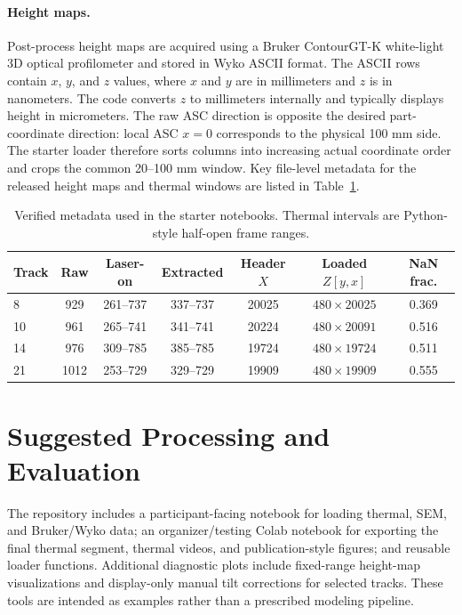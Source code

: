 \documentclass[10pt]{article}
\begin{document}
\paragraph{Height maps.}
Post-process height maps are acquired using a Bruker ContourGT-K white-light 3D optical profilometer and stored in Wyko ASCII format. The ASCII rows contain $x$, $y$, and $z$ values, where $x$ and $y$ are in millimeters and $z$ is in nanometers. The code converts $z$ to millimeters internally and typically displays height in micrometers. The raw ASC direction is opposite the desired part-coordinate direction: local ASC $x=0$ corresponds to the physical 100 mm side. The starter loader therefore sorts columns into increasing actual coordinate order and crops the common 20--100 mm window. Key file-level metadata for the released height maps and thermal windows are listed in Table~\ref{tab:data}.

\begin{table}[t]
\centering
\caption{Verified metadata used in the starter notebooks. Thermal intervals are Python-style half-open frame ranges.}
\small
\begin{tabular}{lcccccc}
\toprule
Track & Raw & Laser-on & Extracted & Header $X$ & Loaded $Z[y,x]$ & NaN frac. \\
\midrule
8  & 929  & 261--737 & 337--737 & 20025 & $480\times 20025$ & 0.369 \\
10 & 961  & 265--741 & 341--741 & 20224 & $480\times 20091$ & 0.516 \\
14 & 976  & 309--785 & 385--785 & 19724 & $480\times 19724$ & 0.511 \\
21 & 1012 & 253--729 & 329--729 & 19909 & $480\times 19909$ & 0.555 \\
\bottomrule
\end{tabular}
\label{tab:data}
\end{table}

\section{Suggested Processing and Evaluation}
The repository includes a participant-facing notebook for loading thermal, SEM, and Bruker/Wyko data; an organizer/testing Colab notebook for exporting the final thermal segment, thermal videos, and publication-style figures; and reusable loader functions. Additional diagnostic plots include fixed-range height-map visualizations and display-only manual tilt corrections for selected tracks. These tools are intended as examples rather than a prescribed modeling pipeline.
\end{document}
